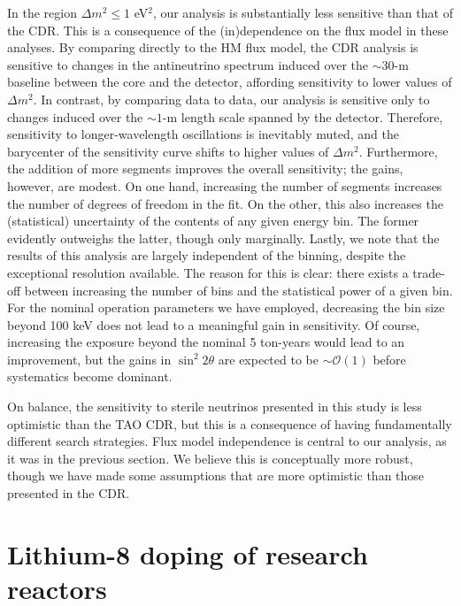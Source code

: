 \documentclass[prd, twocolumn, tightenlines, twoside, secnumarabic, superscriptaddress, preprintnumbers, nofootinbib, notitlepage]{revtex4-1}
\begin{document}
In the region $\Delta m^2 \leq 1$ eV$^2$, our analysis is substantially less sensitive than that of the CDR. This is a consequence of the (in)dependence on the flux model in these analyses. By comparing directly to the HM flux model, the CDR analysis is sensitive to changes in the antineutrino spectrum induced over the $\sim30$-m baseline between the core and the detector, affording sensitivity to lower values of $\Delta m^2$. In contrast, by comparing data to data, our analysis is sensitive only to changes induced over the $\sim1$-m length scale spanned by the detector. Therefore, sensitivity to longer-wavelength oscillations is inevitably muted, and the barycenter of the sensitivity curve shifts to higher values of $\Delta m^2$. Furthermore, the addition of more segments improves the overall sensitivity; the gains, however, are modest. On one hand, increasing the number of segments increases the number of degrees of freedom in the fit. On the other, this also increases the (statistical) uncertainty of the contents of any given energy bin. The former evidently outweighs the latter, though only marginally. Lastly, we note that the results of this analysis are largely independent of the binning, despite the exceptional resolution available. The reason for this is clear: there exists a trade-off between increasing the number of bins and the statistical power of a given bin. For the nominal operation parameters we have employed, decreasing the bin size beyond 100 keV does not lead to a meaningful gain in sensitivity. Of course, increasing the exposure beyond the nominal 5 ton-years would lead to an improvement, but the gains in $\sin^2 2\theta$ are expected to be $\sim\mathcal{O}(1)$ before systematics become dominant.

On balance, the sensitivity to sterile neutrinos presented in this study is less optimistic than the TAO CDR, but this is a consequence of having fundamentally different search strategies. Flux model independence is central to our analysis, as it was in the previous section. We believe this is conceptually more robust, though we have made some assumptions that are more optimistic than those presented in the CDR.

\section{Lithium-8 doping of research reactors}

\label{sec:li8}
\setcounter{equation}{0}
\end{document}
